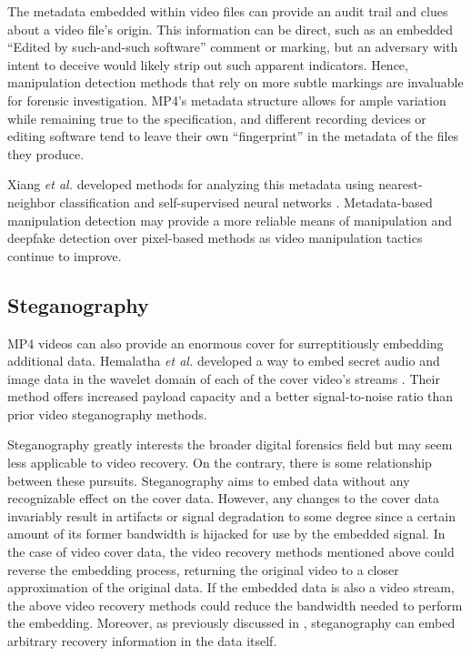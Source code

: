 The metadata embedded within video files can provide an audit trail and clues about a video file's origin. This information can be direct, such as an embedded ``Edited by such-and-such software'' comment or marking, but an adversary with intent to deceive would likely strip out such apparent indicators. Hence, manipulation detection methods that rely on more subtle markings are invaluable for forensic investigation. MP4's metadata structure allows for ample variation while remaining true to the specification, and different recording devices or editing software tend to leave their own ``fingerprint'' in the metadata of the files they produce.

Xiang \emph{et al.} developed methods for analyzing this metadata using nearest-neighbor classification \cite{xiang2021} and self-supervised neural networks \cite{xiang2023}. Metadata-based manipulation detection may provide a more reliable means of manipulation and deepfake detection over pixel-based methods as video manipulation tactics continue to improve.

\subsection{Steganography}

MP4 videos can also provide an enormous cover for surreptitiously embedding additional data. Hemalatha \emph{et al.} developed a way to embed secret audio and image data in the wavelet domain of each of the cover video's streams \cite{hemalatha2017}. Their method offers increased payload capacity and a better signal-to-noise ratio than prior video steganography methods.

Steganography greatly interests the broader digital forensics field but may seem less applicable to video recovery. On the contrary, there is some relationship between these pursuits. Steganography aims to embed data without any recognizable effect on the cover data. However, any changes to the cover data invariably result in artifacts or signal degradation to some degree since a certain amount of its former bandwidth is hijacked for use by the embedded signal. In the case of video cover data, the video recovery methods mentioned above could reverse the embedding process, returning the original video to a closer approximation of the original data. If the embedded data is also a video stream, the above video recovery methods could reduce the bandwidth needed to perform the embedding. Moreover, as previously discussed in \cite{chen2011}, steganography can embed arbitrary recovery information in the data itself.

